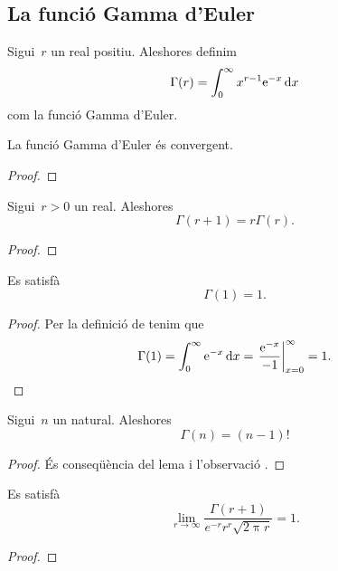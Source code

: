 \documentclass[../../Main.tex]{subfiles}
\begin{document}
	\subsection{La funció Gamma d'Euler}
	\begin{definition}
		\label{def:Gamma d'Euler}
		Sigui~\(r\) un real positiu.
		Aleshores definim
		\[
		    \Gamma(r)=\int_{0}^{\infty}x^{r-1}\mathrm{e}^{-x}\mathop{}\!\mathrm{d} x
		\]
		com la funció Gamma d'Euler.
	\end{definition}
	\begin{theorem}
		\label{thm:la funció Gamma d'Euler és convergent}
		La funció Gamma d'Euler és convergent.
		\begin{proof}
		\end{proof}
	\end{theorem}
	\begin{lemma} %
		\label{lema:la Gamma d'Euler es comporta com un factorial amb reals}
		Sigui~\(r>0\) un real.
		Aleshores
		\[
		    \Gamma(r+1)=r\Gamma(r).
		\]
		\begin{proof}
		\end{proof}
	\end{lemma}
	\begin{observation}
		\label{obs:valor n=1 per la Gamma d'Euler}
		Es satisfà
		\[
		    \Gamma(1)=1.
		\]
		\begin{proof} %
			Per la definició de  tenim que
			\[
			    \Gamma(1)=\int_{0}^{\infty}\e^{-x}\diff x=\left.\frac{\e^{-x}}{-1}\right\vert_{x=0}^{\infty}=1.\qedhere
			\]
		\end{proof}
	\end{observation}
	\begin{lemma} %
		\label{lema:la Gamma d'Euler es comporta com un factorial}
		Sigui~\(n\) un natural.
		Aleshores
		\[
		    \Gamma(n)=(n-1)!
		\]
		\begin{proof}
			És conseqüència del lema  i l'observació .
		\end{proof}
	\end{lemma}
	\begin{theorem}
		\label{thm:fórmula d'Stirling}
		Es satisfà
		\[
		    \lim_{r\to\infty}\frac{\Gamma(r+1)}{e^{-r}r^{r}\sqrt{2\uppi r}}=1.
		\]
		\begin{proof}
		\end{proof}
	\end{theorem}
\end{document}
